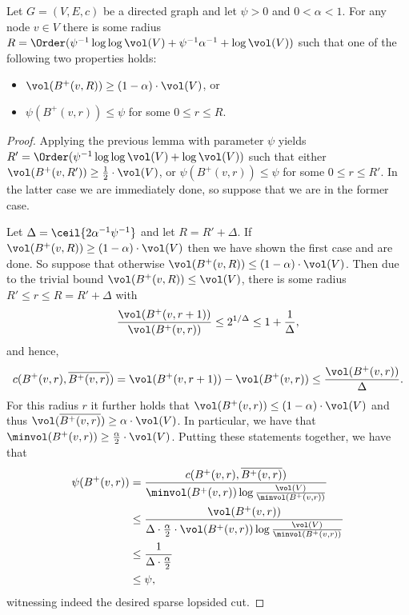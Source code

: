 \begin{lemma} \label{lem:lopsided-expansion-boosted}
Let $G = (V, E, c)$ be a directed graph and let $\psi > 0$ and $0 < \alpha < 1$. For any node $v \in V$ there is some radius $R = \Order(\psi^{-1} \log\log \vol(V) + \psi^{-1} \alpha^{-1} + \log \vol(V))$ such that one of the following two properties holds:
\begin{itemize}
	\item $\vol(B^+(v, R)) \geq (1 - \alpha) \cdot \vol(V)$, or
	\item $\psi(B^+(v, r)) \leq \psi$ for some $0 \leq r \leq R$.
\end{itemize}
\end{lemma}
\begin{proof}
Applying the previous lemma with parameter $\psi$ yields $R' = \Order(\psi^{-1} \log\log \vol(V) + \log \vol(V))$ such that either $\vol(B^+(v, R')) \geq \frac{1}{2} \cdot \vol(V)$, or $\psi(B^+(v, r)) \leq \psi$ for some $0 \leq r \leq R'$. In the latter case we are immediately done, so suppose that we are in the former case.

Let $\Delta = \ceil{2 \alpha^{-1} \psi^{-1}}$ and let $R = R' + \Delta$. If $\vol(B^+(v, R)) \geq (1 - \alpha) \cdot \vol(V)$ then we have shown the first case and are done. So suppose that otherwise $\vol(B^+(v, R)) \leq (1 - \alpha) \cdot \vol(V)$. Then due to the trivial bound $\vol(B^+(v, R)) \leq \vol(V)$, there is some radius $R' \leq r \leq R = R' + \Delta$ with
\begin{equation*}
	\frac{\vol(B^+(v, r + 1))}{\vol(B^+(v, r))} \leq 2^{1/\Delta} \leq 1 + \frac{1}{\Delta},
\end{equation*}
and hence,
\begin{equation*}
	c(B^+(v, r), \overline{B^+(v, r)}) = \vol(B^+(v, r + 1)) - \vol(B^+(v, r)) \leq \frac{\vol(B^+(v, r))}{\Delta}.
\end{equation*}
For this radius $r$ it further holds that $\vol(B^+(v, r)) \leq (1 - \alpha) \cdot \vol(V)$ and thus $\vol(\overline{B^+(v, r)}) \geq \alpha \cdot \vol(V)$. In particular, we have that $\minvol(B^+(v, r)) \geq \frac{\alpha}{2} \cdot \vol(V)$. Putting these statements together, we have that
\begin{align*}
	\psi(B^+(v, r))
	&= \frac{c(B^+(v, r), \overline{B^+(v, r)})}{\minvol(B^+(v, r)) \log \frac{\vol(V)}{\minvol(B^+(v, r))}} \\
	&\leq \frac{\vol(B^+(v, r))}{\Delta \cdot \frac{\alpha}{2} \cdot \vol(B^+(v, r)) \log \frac{\vol(V)}{\minvol(B^+(v, r))}} \\
	&\leq \frac{1}{\Delta \cdot \frac{\alpha}{2}} \\
	&\leq \psi,
\end{align*}
witnessing indeed the desired sparse lopsided cut.
\end{proof}


